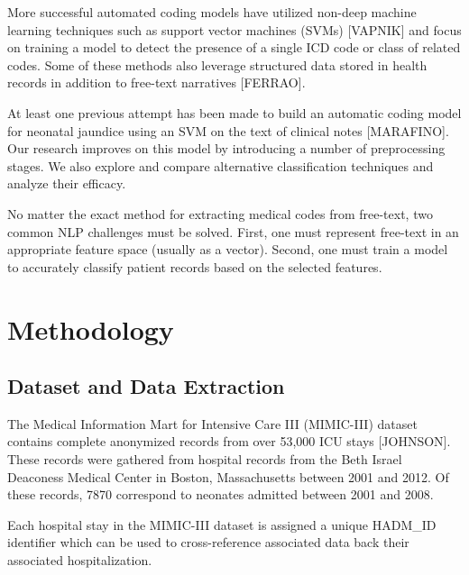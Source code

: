 \documentclass[conference]{IEEEtran}
\begin{document}
More successful automated coding models have utilized non-deep machine learning techniques such as support vector machines (SVMs) [VAPNIK] and focus on training a model to detect the presence of a single ICD code or class of related codes. Some of these methods also leverage structured data stored in health records in addition to free-text narratives [FERRAO].

At least one previous attempt has been made to build an automatic coding model for neonatal jaundice using an SVM on the text of clinical notes [MARAFINO]. Our research improves on this model by introducing a number of preprocessing stages. We also explore and compare alternative classification techniques and analyze their efficacy.

No matter the exact method for extracting medical codes from free-text, two common NLP challenges must be solved. First, one must represent free-text in an appropriate feature space (usually as a vector). Second, one must train a model to accurately classify patient records based on the selected features. 

\section{Methodology}
\subsection{Dataset and Data Extraction}\label{AA}
The Medical Information Mart for Intensive Care III (MIMIC-III) dataset contains complete anonymized records from over 53,000 ICU stays [JOHNSON]. These records were gathered from hospital records from the Beth Israel Deaconess Medical Center in Boston, Massachusetts between 2001 and 2012. Of these records, 7870 correspond to neonates admitted between 2001 and 2008. 

Each hospital stay in the MIMIC-III dataset is assigned a unique HADM\_ID identifier which can be used to cross-reference associated data back their associated hospitalization.
\end{document}
